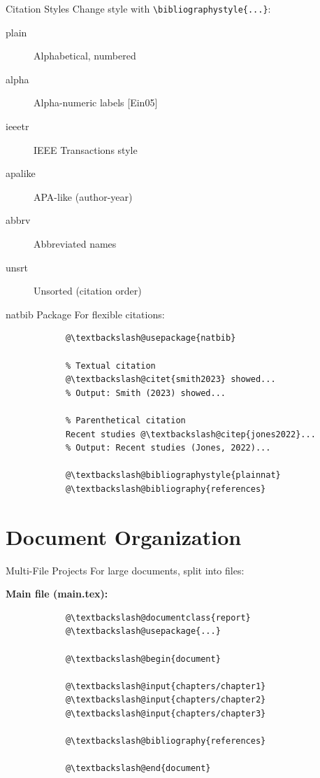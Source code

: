 \documentclass[aspectratio=169]{beamer}
\begin{document}
	\begin{frame}{Citation Styles}
		Change style with \texttt{\textbackslash bibliographystyle\{...\}}:
		
		\begin{description}
			\item[plain] Alphabetical, numbered
			\item[alpha] Alpha-numeric labels [Ein05]
			\item[ieeetr] IEEE Transactions style
			\item[apalike] APA-like (author-year)
			\item[abbrv] Abbreviated names
			\item[unsrt] Unsorted (citation order)
		\end{description}
	\end{frame}
	
	\begin{frame}[fragile]{natbib Package}
		For flexible citations:
		
		\begin{lstlisting}
			@\textbackslash@usepackage{natbib}
			
			% Textual citation
			@\textbackslash@citet{smith2023} showed...
			% Output: Smith (2023) showed...
			
			% Parenthetical citation
			Recent studies @\textbackslash@citep{jones2022}...
			% Output: Recent studies (Jones, 2022)...
			
			@\textbackslash@bibliographystyle{plainnat}
			@\textbackslash@bibliography{references}
		\end{lstlisting}
	\end{frame}
	
	\section{Document Organization}
	
	\begin{frame}[fragile]{Multi-File Projects}
		For large documents, split into files:
		
		\textbf{Main file (main.tex):}
		\begin{lstlisting}
			@\textbackslash@documentclass{report}
			@\textbackslash@usepackage{...}
			
			@\textbackslash@begin{document}
			
			@\textbackslash@input{chapters/chapter1}
			@\textbackslash@input{chapters/chapter2}
			@\textbackslash@input{chapters/chapter3}
			
			@\textbackslash@bibliography{references}
			
			@\textbackslash@end{document}
		\end{lstlisting}
	\end{frame}
	
\end{document}
